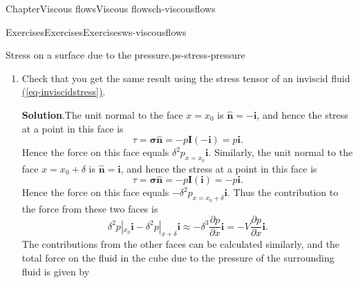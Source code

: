 \documentclass[oneside,10pt,]{book}
\newcommand{\blocktitlefont}{\relax}
\newcommand{\xreffont}{\relax}
\numberwithin{equation}{section}
\newcommand{\pd}[2]{\frac{\partial#1}{\partial#2}}
\newcommand{\bn}{\boldsymbol{n}}
\newcommand{\bsigma}{\boldsymbol{\sigma}}
\newcommand{\bI}{\boldsymbol{I}}
\newcommand{\bi}{\boldsymbol{i}}
\newcommand{\bj}{\boldsymbol{j}}
\newcommand{\bk}{\boldsymbol{k}}
\begin{document}
\begin{chapterptx}{Chapter}{Viscous flows}{}{Viscous flows}{}{}{ch-viscousflows}
\begin{exercises-section}{Exercises}{Exercises}{}{Exercises}{}{}{ws-viscousflows}
\begin{divisionexercise}{2}{Stress on a surface due to the pressure.}{}{ps-stress-pressure}
\begin{enumerate}[font=\bfseries,label=(\alph*),ref=\alph*]
\begin{equation*}
\end{equation*}
%
\par\smallskip%
\noindent\textbf{\blocktitlefont Solution}.\hypertarget{ps-stress-pressure-4-2}{}\quad{}The force on \(y=y_0\) is \(\delta^2p|_{y_0}\bj\) and that on \(y=y_0+\delta\) is \(-\delta^2p|_{y+\delta}\bj\). This gives a contribution%
\begin{equation*}
\delta^2p|_{y_0}\bj-\delta^2p|_{y+\delta}\bj
\approx-\delta^3\pd{p}{y}\bj=-V\pd{p}{y}\bj.
\end{equation*}
Similarly, the force on \(z=z_0\) is \(\delta^2p|_{z_0}\bk\) and that on \(z=z_0+\delta\) is \(-\delta^2p|_{z+\delta}\bk\). This gives a contribution%
\begin{equation*}
\delta^2p|_{z_0}\bk-\delta^2p|_{z+\delta}\bk
\approx-\delta^3\pd{p}{z}\bk=-V\pd{p}{z}\bk.
\end{equation*}
Hence the total force on the fluid in the cube due to the pressure of the surrounding fluid is given by%
\begin{equation*}
-V\pd{p}{x}\bi-V\pd{p}{y}\bj-V\pd{p}{z}\bk=-V\nabla p.
\end{equation*}
%
\item{}Check that you get the same result using the stress tensor of an inviscid fluid \hyperref[eq-inviscidstress]{({\xreffont\ref{eq-inviscidstress}})}.%
\par\smallskip%
\noindent\textbf{\blocktitlefont Solution}.\hypertarget{ps-stress-pressure-5-2}{}\quad{}The unit normal to the face \(x=x_0\) is \(\hat{\bn}=-\bi\), and hence the stress at a point in this face is%
\begin{equation*}
\tau=\bsigma\hat{\bn}=-p\bI(-\bi)=p\bi.
\end{equation*}
Hence the force on this face equals \(\delta^2p_{x=x_0}\bi\). Similarly, the unit normal to the face \(x=x_0+\delta\) is \(\hat{\bn}=\bi\), and hence the stress at a point in this face is%
\begin{equation*}
\tau=\bsigma\hat{\bn}=-p\bI(\bi)=-p\bi.
\end{equation*}
Hence the force on this face equals \(-\delta^2p_{x=x_0+\delta}\bi\). Thus the contribution to the force from these two faces is%
\begin{equation*}
\delta^2p|_{x_0}\bi-\delta^2p|_{x+\delta}\bi
\approx-\delta^3\pd{p}{x}\bi=-V\pd{p}{x}\bi.
\end{equation*}
The contributions from the other faces can be calculated similarly, and the total force on the fluid in the cube due to the pressure of the surrounding fluid is given by%

\end{enumerate}
\end{divisionexercise}
\end{exercises-section}
\end{chapterptx}
\end{document}

